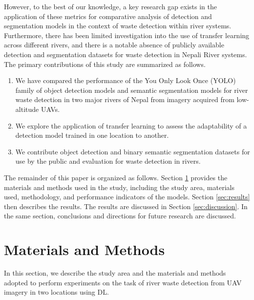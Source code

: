 \documentclass{ieeeaccess}
\begin{document}
However, to the best of our knowledge, a key research gap exists in the application of these metrics for comparative analysis of detection and segmentation models in the context of waste detection within river systems. Furthermore, there has been limited investigation into the use of transfer learning across different rivers, and there is a notable absence of publicly available detection and segmentation datasets for waste detection in Nepali River systems.
The primary contributions of this study are summarized as follows.
\begin{enumerate}
    \item We have compared the performance of the You Only Look Once (YOLO) family of object detection models and semantic segmentation models for river waste detection in two major rivers of Nepal from imagery acquired from low-altitude UAVs.
    \item We explore the application of transfer learning to assess the adaptability of a detection model trained in one location to another.
    \item We contribute object detection and binary semantic segmentation datasets for use by the public and evaluation for waste detection in rivers. 
\end{enumerate}

The remainder of this paper is organized as follows. Section \ref{sec:material_methods} provides the materials and methods used in the study, including the study area, materials used, methodology, and performance indicators of the models. Section \ref{sec:results} then describes the results. The results are discussed in Section \ref{sec:discussion}. In the same section, conclusions and directions for future research are discussed.

\section{Materials and Methods}
\label{sec:material_methods}

In this section, we describe the study area and the materials and methods adopted to perform experiments on the task of river waste detection from UAV imagery in two locations using DL. 
\end{document}
